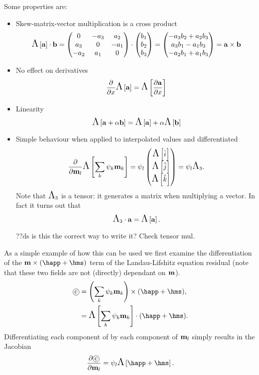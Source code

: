 Some properties are:
\begin{itemize}
\item Skew-matrix-vector multiplication is a cross product
  \begin{equation}
    \text{\Large{$\Lambda$}}\left[ {\mathbf{a}} \right] \cdot {\mathbf{b}}
    = \begin{pmatrix}
      0 & -a_3 & a_2 \\
    a_3 & 0 & -a_1 \\
    -a_2 & a_1 & 0
  \end{pmatrix}
    \cdot \begin{pmatrix} b_1 \\ b_2 \\ b_3 \end{pmatrix}
    = \begin{pmatrix} -a_3b_2 + a_2b_3 \\ a_3b_1 - a_1b_3 \\ -a_2b_1 + a_1b_3 \end{pmatrix}
    = {\mathbf{a}} \times {\mathbf{b}}
  \end{equation}

\item No effect on derivatives
  \begin{equation}
    \frac{\partial }{\partial x} \text{\Large{$\Lambda$}}\left[ {\mathbf{a}} \right] = \text{\Large{$\Lambda$}}\left[  \frac{\partial {\mathbf{a}}}{\partial x}  \right]
  \end{equation}

\item Linearity
  \begin{equation}
    \text{\Large{$\Lambda$}}\left[ {\mathbf{a}} + \alpha {\mathbf{b}} \right] = \text{\Large{$\Lambda$}}\left[ {\mathbf{a}} \right] + \alpha \text{\Large{$\Lambda$}}\left[ {\mathbf{b}} \right]
  \end{equation}

\item Simple behaviour when applied to interpolated values and differentiated
  \begin{equation}
    \frac{\partial }{\partial \mathbf{m}_l} \text{\Large{$\Lambda$}}\left[ \sum_{k} {\psi_k} \mathbf{m}_{k} \right] = \psi_l \begin{pmatrix} \text{\Large{$\Lambda$}}\left[ {\hat{i}} \right] \\ \text{\Large{$\Lambda$}}\left[ {\hat{j}} \right] \\ \text{\Large{$\Lambda$}}\left[ {\hat{k}} \right] \end{pmatrix}
    = \psi_l \text{\Large{$\Lambda$}}_3.
  \end{equation}
  Note that $\text{\Large{$\Lambda$}}_3$ is a tensor: it generates a matrix when multiplying a vector. In fact it turns out that
  \begin{equation}
    \text{\Large{$\Lambda$}}_3 \cdot {\mathbf{a}} = \text{\Large{$\Lambda$}}\left[ {\mathbf{a}} \right].
  \end{equation}

  ??ds is this the correct way to write it? Check tensor mul.
\end{itemize}

As a simple example of how this can be used we first examine the differentiation of the $\mv \times (\happ + \hms)$ term of the Landau-Lifshitz equation residual (note that these two fields are not (directly) dependant on $\mathbf{m}$).
\begin{align}
  \circled{c} &= \intpb{\mv} \times (\happ + \hms), \notag\\
  &= \skewm{\intp{\mv}} \cdot (\happ + \hms).
\end{align}
Differentiating each component of  by each component of $\mathbf{m}_l$ simply results in the Jacobian
\begin{align}
  \pd{\circled{c}}{\mv_l} = \sbf_l \skewm{\happ + \hms}.
\end{align}

